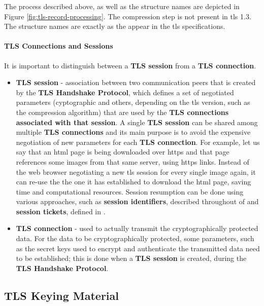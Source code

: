 \documentclass{llncs}
\begin{document}
The process described above, as well as the structure names are depicted in Figure \ref{fig:tls-record-processing}.
The compression step is not present in \gls{tls} 1.3. The structure names are exactly as the appear in the \gls{tls} specifications.

\paragraph{TLS Connections and Sessions}

It is important to distinguish between a \textbf{TLS session} from a \textbf{TLS connection}.
\begin{itemize}
  \item \textbf{TLS session} - association between two communication peers that is
  created by the \textbf{TLS Handshake Protocol}, which defines a set of negotiated parameters
  (cyptographic and others, depending on the \gls{tls} version, such as
  the compression algorithm) that are used by the \textbf{TLS connections associated
  with that session}. A single \textbf{TLS session} can be shared among multiple
  \textbf{TLS connections} and its main purpose is to avoid the expensive negotiation
  of new parameters for each \textbf{TLS connection}. For example, let us say
  that an \gls{html} page is being downloaded over \gls{https} and that page references some images from that same server, using \gls{https} links. Instead of the web browser negotiating a new \gls{tls} session for every single image again, it can re-use the the
  one it has established to download the \gls{html} page,
  saving time and computational resources. Session resumption can be done using various
  approaches, such as \textbf{session identifiers}, described throughout 
  of \cite{RFC5246} and \textbf{session tickets}, defined in
  \cite{RFC5077}.
  \item \textbf{TLS connection} - used to actually transmit the cryptographically
  protected data. For the data to be cryptographically protected, some parameters,
  such as the secret keys used to encrypt and authenticate the transmitted
  data need to be established; this is done when a \textbf{TLS session} is created,
  during the \textbf{TLS Handshake Protocol}.
\end{itemize}

\subsection{TLS Keying Material}
\end{document}

